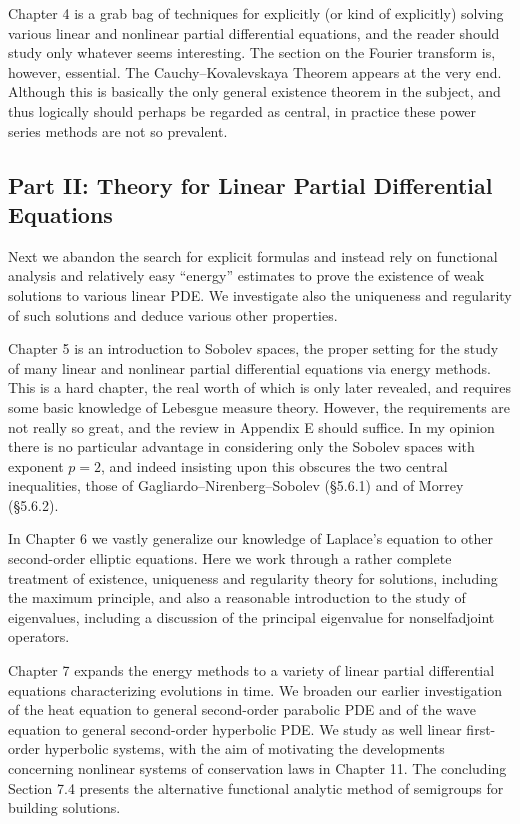Chapter 4 is a grab bag of techniques for explicitly (or kind of explicitly) solving various linear and nonlinear partial differential equations, and the reader should study only whatever seems interesting. The section on the Fourier transform is, however, essential. The Cauchy--Kovalevskaya Theorem appears at the very end. Although this is basically the only general existence theorem in the subject, and thus logically should perhaps be regarded as central, in practice these power series methods are not so prevalent.

\subsection*{Part II: Theory for Linear Partial Differential Equations} Next we abandon the search for explicit formulas and instead rely on functional analysis and relatively easy ``energy'' estimates to prove the existence of weak solutions to various linear PDE. We investigate also the uniqueness and regularity of such solutions and deduce various other properties.

\par\Needspace{65mm}

Chapter 5 is an introduction to Sobolev spaces, the proper setting for the study of many linear and nonlinear partial differential equations via energy methods. This is a hard chapter, the real worth of which is only later revealed, and requires some basic knowledge of Lebesgue measure theory. However, the requirements are not really so great, and the review in Appendix E should suffice. In my opinion there is no particular advantage in considering only the Sobolev spaces with exponent $p=2$, and indeed insisting upon this obscures the two central inequalities, those of Gagliardo--Nirenberg--Sobolev (\S5.6.1) and of Morrey (\S5.6.2).

In Chapter 6 we vastly generalize our knowledge of Laplace's equation to other second-order elliptic equations. Here we work through a rather complete treatment of existence, uniqueness and regularity theory for solutions, including the maximum principle, and also a reasonable introduction to the study of eigenvalues, including a discussion of the principal eigenvalue for nonselfadjoint operators.

Chapter 7 expands the energy methods to a variety of linear partial differential equations characterizing evolutions in time. We broaden our earlier investigation of the heat equation to general second-order parabolic PDE and of the wave equation to general second-order hyperbolic PDE. We study as well linear first-order hyperbolic systems, with the aim of motivating the developments concerning nonlinear systems of conservation laws in Chapter 11. The concluding Section 7.4 presents the alternative functional analytic method of semigroups for building solutions.

